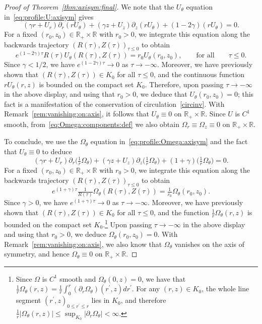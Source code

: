 \documentclass[11pt,reqno]{amsproc}
\numberwithin{equation}{section}
\theoremstyle{remark}
\begin{document}
\begin{proof}[Proof of Theorem~\ref{thm:axisym:final}]
We note that the $U_\theta$ equation in~\eqref{eq:profile:U:axisym} gives 
\[
(\gamma r + U_r) \partial_r (r U_\theta) 
+ 
(\gamma z + U_z) \partial_z (r U_\theta)
+
(1-2\gamma) (r U_\theta)
=
0.
\]
For a fixed $(r_0,z_0)\in\mathbb{R}_+\times \mathbb{R}$ with $r_0>0$, we integrate this equation along the backwards trajectory $( R(\tau),Z(\tau) )_{\tau \leq 0}$ to obtain
\[
e^{(1-2\gamma) \tau} R(\tau) U_\theta(R(\tau),Z(\tau)) 
=
r_0 U_\theta(r_0,z_0),
\qquad
\mbox{for all}
\qquad
\tau\leq 0.
\]
Since $\gamma<1/2$, we have $e^{(1-2\gamma) \tau}  \to 0$ as $\tau\to - \infty$. Moreover, we have previously shown that  $(R(\tau),Z(\tau)) \in K_0$ for all $\tau\leq 0$, and the continuous function $rU_\theta(r,z)$ is bounded on the compact set $K_0$. Therefore, upon passing $\tau \to -\infty$ in the above display, and using that $r_0>0$, we deduce that $U_\theta(r_0,z_0)=0$; this fact is a manifestation of the conservation of circulation~\eqref{circinv}. 
With Remark~\ref{rem:vanishing:on:axis}, it follows that $U_\theta \equiv 0$ on $\mathbb{R}_+\times\mathbb{R}$. Since $U$ is $C^1$ smooth, from~\eqref{eq:Omega:components:def} we also obtain $\Omega_r \equiv \Omega_z \equiv 0$ on $\mathbb{R}_+\times\mathbb{R}$.

To conclude, we use the $\Omega_\theta$ equation in~\eqref{eq:profile:Omega:axisym} and the fact that $U_\theta\equiv0$ to deduce
\[
(\gamma r + U_r) \partial_r \bigl(\tfrac{1}{r} \Omega_\theta\bigr)
+ 
(\gamma z + U_z) \partial_z \bigl(\tfrac{1}{r} \Omega_\theta\bigr)
+
(1+\gamma) \bigl(\tfrac{1}{r} \Omega_\theta\bigr)
=
0.
\]
For a fixed $(r_0,z_0)\in\mathbb{R}_+\times \mathbb{R}$ with $r_0>0$, we integrate this equation along the backwards trajectory $( R(\tau),Z(\tau) )_{\tau \leq 0}$ to obtain
\[
e^{(1+\gamma) \tau} \tfrac{1}{R(\tau)} \Omega_\theta(R(\tau),Z(\tau)) 
=
\tfrac{1}{r_0} \Omega_\theta(r_0,z_0).
\]
Since $\gamma>0$, we have $e^{(1+\gamma) \tau}  \to 0$ as $\tau\to - \infty$.  Moreover, we have previously shown that  $(R(\tau),Z(\tau)) \in K_0$ for all $\tau \leq 0$, and  the function $\frac{1}{r} \Omega_\theta(r,z)$ is bounded on the compact set $K_0$.\footnote{Since $\Omega$ is $C^1$ smooth and $\Omega_\theta(0,z) = 0$, we have that $\frac{1}{r} \Omega_\theta(r,z) = \frac{1}{r} \int_0^r (\partial_r \Omega_\theta)(r^\prime,z) dr^\prime$. For any $(r,z) \in K_0$, the whole line segment $(r^\prime,z)_{0\leq r^\prime\leq r}$ lies in $K_0$, and therefore $\frac{1}{r} |\Omega_\theta(r,z)| \leq \sup_{K_0}|\partial_r \Omega_\theta| < \infty$.}
Upon passing $\tau\to -\infty$ in the above display and using that $r_0>0$, we  deduce $\Omega_\theta(r_0,z_0)=0$. 
With Remark~\ref{rem:vanishing:on:axis}, we also know that $\Omega_\theta$ vanishes on the axis of symmetry, and hence  $\Omega_\theta \equiv 0$ on $\mathbb{R}_+ \times \mathbb{R}$. 


\end{proof}
\end{document}
